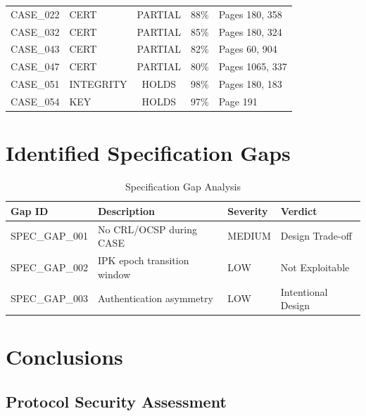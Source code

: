 \documentclass[11pt,a4paper]{article}
\begin{document}
\begin{longtable}{llccp{4cm}}
    CASE\_022 & CERT & \textcolor{warningorange}{PARTIAL} & 88\% & Pages 180, 358 \\
    CASE\_032 & CERT & \textcolor{warningorange}{PARTIAL} & 85\% & Pages 180, 324 \\
    CASE\_043 & CERT & \textcolor{warningorange}{PARTIAL} & 82\% & Pages 60, 904 \\
    CASE\_047 & CERT & \textcolor{warningorange}{PARTIAL} & 80\% & Pages 1065, 337 \\
    CASE\_051 & INTEGRITY & \textcolor{safegreen}{HOLDS} & 98\% & Pages 180, 183 \\
    CASE\_054 & KEY & \textcolor{safegreen}{HOLDS} & 97\% & Page 191 \\
    
\end{longtable}

\section{Identified Specification Gaps}

\begin{table}[H]
    \centering
    \caption{Specification Gap Analysis}
    \begin{tabular}{llll}
        \toprule
        \textbf{Gap ID} & \textbf{Description} & \textbf{Severity} & \textbf{Verdict} \\
        \midrule
        SPEC\_GAP\_001 & No CRL/OCSP during CASE & MEDIUM & Design Trade-off \\
        SPEC\_GAP\_002 & IPK epoch transition window & LOW & Not Exploitable \\
        SPEC\_GAP\_003 & Authentication asymmetry & LOW & Intentional Design \\
        \bottomrule
    \end{tabular}
\end{table}

\section{Conclusions}

\subsection{Protocol Security Assessment}
\end{document}
